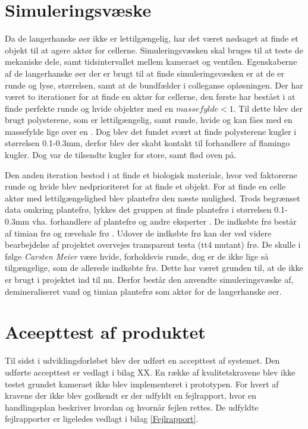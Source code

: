 

\section{Simuleringsvæske}
\label{sec:simuleringsv}
Da de langerhanske øer ikke er lettilgængelig, har det været nødsaget at finde et objekt til at agere aktør for cellerne. Simuleringsvæsken skal bruges til at teste de mekaniske dele, samt tidsintervallet mellem kameraet og ventilen. Egenskaberne af de langerhanske øer der er brugt til at finde simuleringsvæsken er at de er runde og lyse, størrelsen, samt at de bundfælder i colleganse opløsningen. Der har været to iterationer for at finde en aktør for cellerne, den første har bestået i at finde perfekte runde og hvide objekter med en $massefylde<1$. Til dette blev der brugt polysterene, som er lettilgængelig, samt runde, hvide og kan fåes med en massefylde lige over en . Dog blev det fundet svært at finde polysterene kugler i størrelsen 0.1-0.3mm, derfor blev der skabt kontakt til forhandlere af flamingo kugler. Dog var de tilsendte kugler for store, samt flød oven på. 

Den anden iteration bestod i at finde et biologisk materiale, hvor ved faktorerne runde og hvide blev nedprioriteret for at finde et objekt. For at finde en celle aktør med lettilgængelighed blev plantefrø den næste mulighed. Trods begrænset data omkring plantefrø, lykkes det gruppen at finde plantefrø i størrelsen 0.1-0.3mm vha. forhandlere af plantefrø og andre eksperter . De indkøbte frø består af timian frø og rævehale frø . Udover de indkøbte frø kan der ved videre bearbejdelse af projektet overvejes transparent testa (tt4 mutant) frø. De skulle i følge \textit{Carsten Meier} være hvide, forholdsvis runde, dog er de ikke lige så tilgængelige, som de allerede indkøbte frø. Dette har været grunden til, at de ikke er brugt i projektet ind til nu. Derfor består den anvendte simuleringsvæske af, demineraliseret vand og timian plantefrø som aktør for de langerhanske øer.  
 
\section{Aceepttest af produktet} 
Til sidst i udviklingsforløbet blev der udført en accepttest af systemet. Den udførte accepttest er vedlagt i bilag XX. En række af kvalitetskravene blev ikke testet grundet kameraet ikke blev implementeret i prototypen. For hvert af kravene der ikke blev godkendt er der udfyldt en fejlrapport, hvor en handlingsplan beskriver hvordan og hvornår fejlen rettes. De udfyldte fejlrapporter er ligeledes vedlagt i bilag \ref{Fejlrapport}.

